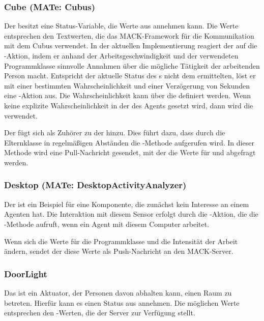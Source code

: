 \subsubsection{Cube (MATe: Cubus)}
Der  besitzt eine Status-Variable, die Werte aus  annehmen kann. Die Werte entsprechen den Textwerten, die das MACK-Framework für die Kommunikation mit dem Cubus verwendet. In der aktuellen Implementierung reagiert der  auf die -Aktion, indem er anhand der Arbeitsgeschwindigkeit und der verwendeten Programmklasse sinnvolle Annahmen über die mögliche Tätigkeit der arbeitenden Person macht. Entspricht der aktuelle Status des s nicht dem ermittelten, löst er mit einer bestimmten Wahrscheinlichkeit und einer Verzögerung von  Sekunden eine -Aktion aus. Die Wahrscheinlichkeit kann über die  definiert werden. Wenn keine explizite Wahrscheinlichkeit in der  des Agents gesetzt wird, dann wird die  verwendet.

Der  fügt sich als Zuhörer zu der  hinzu. Dies führt dazu, dass durch die Elternklasse  in regelmäßigen Abständen die -Methode aufgerufen wird. In dieser Methode wird eine Pull-Nachricht gesendet, mit der die Werte für  und  abgefragt werden.

\subsubsection{Desktop (MATe: DesktopActivityAnalyzer)}
Der  ist ein Beispiel für eine Komponente, die zunächst kein Interesse an einem Agenten hat. Die Interaktion mit diesem Sensor erfolgt durch die -Aktion, die die -Methode aufruft, wenn ein Agent mit diesem Computer arbeitet.

Wenn sich die Werte für die Programmklasse und die Intensität der Arbeit ändern, sendet der  diese Werte als Push-Nachricht an den MACK-Server.

\subsubsection{DoorLight}
Das  ist ein Aktuator, der Personen davon abhalten kann, einen Raum zu betreten. Hierfür kann es einen Status aus  annehmen. Die möglichen Werte entsprechen den -Werten, die der Server zur Verfügung stellt.

